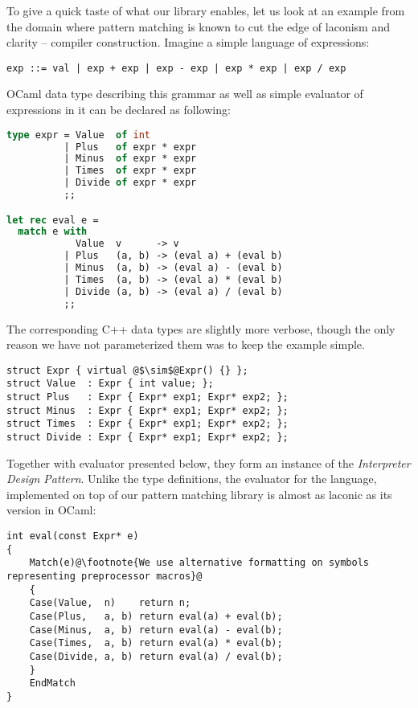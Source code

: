 \documentclass[preprint]{sigplanconf}
\begin{document}
To give a quick taste of what our library enables, let us look at an example from 
the domain where pattern matching is known to cut the edge of laconism and 
clarity -- compiler construction. Imagine a simple language of expressions:

\begin{lstlisting}
exp ::= val | exp + exp | exp - exp | exp * exp | exp / exp
\end{lstlisting}

OCaml data type describing this grammar as well as simple evaluator of expressions 
in it can be declared as following:

\begin{lstlisting}[language=Caml,keepspaces,columns=flexible]
type expr = Value  of int
          | Plus   of expr * expr
          | Minus  of expr * expr
          | Times  of expr * expr
          | Divide of expr * expr
          ;;

let rec eval e =
  match e with
            Value  v      -> v
          | Plus   (a, b) -> (eval a) + (eval b)
          | Minus  (a, b) -> (eval a) - (eval b)
          | Times  (a, b) -> (eval a) * (eval b)
          | Divide (a, b) -> (eval a) / (eval b)
          ;;
\end{lstlisting}

The corresponding C++ data types are slightly more verbose, though the only 
reason we have not parameterized them was to keep the example simple.

\begin{lstlisting}[keepspaces,columns=flexible]
struct Expr { virtual @$\sim$@Expr() {} };
struct Value  : Expr { int value; };
struct Plus   : Expr { Expr* exp1; Expr* exp2; };
struct Minus  : Expr { Expr* exp1; Expr* exp2; };
struct Times  : Expr { Expr* exp1; Expr* exp2; };
struct Divide : Expr { Expr* exp1; Expr* exp2; };
\end{lstlisting}

Together with evaluator presented below, they form an instance of the 
\emph{Interpreter Design Pattern}\cite{DesignPatterns1993}. Unlike the type 
definitions, the evaluator for the language, implemented on top of our pattern 
matching library is almost as laconic as its version in OCaml:

\begin{lstlisting}[keepspaces,columns=flexible]
int eval(const Expr* e)
{
    Match(e)@\footnote{We use alternative formatting on symbols representing preprocessor macros}@
    {
    Case(Value,  n)    return n;
    Case(Plus,   a, b) return eval(a) + eval(b);
    Case(Minus,  a, b) return eval(a) - eval(b);
    Case(Times,  a, b) return eval(a) * eval(b);
    Case(Divide, a, b) return eval(a) / eval(b);
    }
    EndMatch
}
\end{lstlisting}
\end{document}
